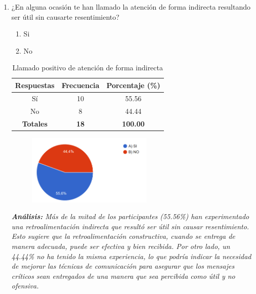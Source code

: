 \documentclass[journal]{IEEEtran}
\begin{document}
\begin{enumerate}
	\item ¿En alguna ocasión te han llamado la atención de forma indirecta resultando ser útil sin causarte resentimiento?
	\begin{enumerate}
		\item Si
		\item No
	\end{enumerate}
	\begin{table}[H]
		\renewcommand{\arraystretch}{1.3}
		\centering
		\caption{Llamado positivo de atención de forma indirecta}
		\begin{tabular}{c c c}
			\hline
			\textbf{Respuestas} & \textbf{Frecuencia} & \textbf{Porcentaje (\%)}\\
			\hline
			Sí & 10 & 55.56\\
			No & 8 & 44.44\\
			\hline
			\textbf{Totales} &\textbf{18}& \textbf{100.00}\\
			\hline
		\end{tabular}
	\end{table}
	\begin{figure}[h]
		\centering
		\includegraphics[width=06cm]{Pregunta19}
	\end{figure}
	\textit{\textbf{Análisis:} Más de la mitad de los participantes (55.56\%) han experimentado una retroalimentación indirecta que resultó ser útil sin causar resentimiento. Esto sugiere que la retroalimentación constructiva, cuando se entrega de manera adecuada, puede ser efectiva y bien recibida. Por otro lado, un 44.44\% no ha tenido la misma experiencia, lo que podría indicar la necesidad de mejorar las técnicas de comunicación para asegurar que los mensajes críticos sean entregados de una manera que sea percibida como útil y no ofensiva.}\\
	

\end{enumerate}
\end{document}
